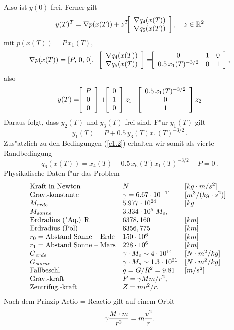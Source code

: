 \documentclass[12pt,a4paper,twoside,leqno]{article}
\begin{document}
Also ist $y(0)$ frei. Ferner gilt
\[
y(T)^T = \nabla p(x(T))
       + z^T\ba{[}{c}\nabla q_4(x(T))\\ \nabla q_5(x(T))\ea{]}, \quad
z \in \mb{R}^2
\]
mit $p(x(T))    = P\, x_1(T)$,
\[
\nabla p(x(T))  = [P, \, 0, \, 0],\quad
\ba{[}{c}\nabla q_4(x(T))\\\nabla q_5(x(T))\ea{]}
 = \ba{[}{ccc}                 0 & 1 & 0\\
              0.5\,x_1(T)^{-3/2} & 0 & 1\ea{]},
\]
also
\[
y(T)  = \ba{[}{c}P\\0\\0\ea{]} +
\ba{[}{c}0\\1\\0\ea{]}z_1 + \ba{[}{c}
0.5\,x_1(T)^{-3/2}\\0\\1\ea{]}z_2
\]
%
Daraus folgt, dass $y_2(T)$ und $y_3(T)$ frei sind. F"ur $y_1(T)$ gilt
\[
y_1(T) =  P + 0.5\, y_3(T)x_1(T)^{-3/2}\,.
\]
%
Zus"atzlich zu den Bedingungen (\ref{e1.2}) erhalten wir somit als vierte
Randbedingung
%
\begin{equation} \label{e2.3}
q_6(x(T)) = x_4(T) - 0.5\, x_6(T)x_1(T)^{-3/2} - P = 0\, .
\end{equation}
%
Physikalische Daten f"ur das Problem
\[
\ba{.}{lll}
\mbox{Kraft in Newton} & N  & [kg \cdot m/s^2]\\
\mbox{Grav.-konstante}  & \gamma  = 6.67\cdot 10^{-11} & [m^3/(kg\cdot s^2)]\\
M_{erde}  & 5.977 \cdot 10^{24}  & [kg]\\
M_{sonne} & 3.334 \cdot 10^5 \; M_e,\\
\mbox{Erdradius ("Aq.) R} & 6378,160 & [km]\\
\mbox{Erdradius (Pol)} & 6356,775   & [km]\\
r_0 = \mbox{Abstand Sonne -- Erde} & 150\cdot 10^6 & [km]\\
r_1 = \mbox{Abstand Sonne -- Mars} & 228\cdot 10^6 & [km]\\
G_{erde}        & \gamma\cdot M_e \sim 4 \cdot 10^{14} & [N\cdot m^2/kg]\\
G_{sonne}        & \gamma\cdot M_s \sim 1.3 \cdot 10^{21} & [N\cdot m^2/kg]\\
\mbox{Fallbeschl.}  &  g = G/R^2  = 9.81 & [m/s^2]\\
\mbox{Grav.-kraft}  &  F = \gamma  M m/r^2,\\
\mbox{Zentrifug.-kraft}  &  Z = m v^2/r.
\ea{.}
\]
Nach dem Prinzip Actio = Reactio gilt auf einem Orbit
\[
\dis \gamma \frac{M\cdot m}{r^2} = m\frac{v^2}{r}.
\]
\end{document}
